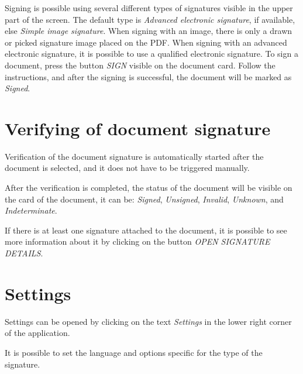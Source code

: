 \documentclass[thesismargins, english, thesislinespacing, onelinechapterstyle, upjsfrontpage]{rnthesis}
\begin{document}

Signing is possible using several different types of signatures visible in the upper part of the screen.
The default type is \textit{Advanced electronic signature}, if available, else \textit{Simple image signature}.
When signing with an image, there is only a drawn or picked signature image placed on the PDF.
When signing with an advanced electronic signature, it is possible to use a qualified electronic signature.
To sign a document, press the button \textit{SIGN} visible on the document card.
Follow the instructions, and after the signing is successful, the document will be marked as \textit{Signed}.


\section{Verifying of document signature}

Verification of the document signature is automatically started after the document is selected, and it does not have to be triggered manually.


After the verification is completed, the status of the document will be visible on the card of the document, it can be: \textit{Signed}, \textit{Unsigned}, \textit{Invalid}, \textit{Unknown}, and \textit{Indeterminate}.

If there is at least one signature attached to the document, it is possible to see more information about it by clicking on the button \textit{OPEN SIGNATURE DETAILS}.

\section{Settings}

Settings can be opened by clicking on the text \textit{Settings} in the lower right corner of the application.

It is possible to set the language and options specific for the type of the signature.

\end{document}
